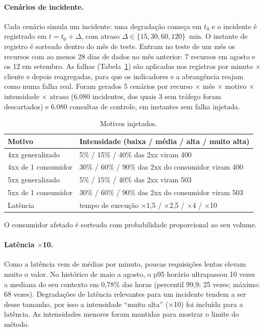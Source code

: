\documentclass[sigconf,nonacm]{acmart}
\begin{document}
\paragraph{Cenários de incidente.} Cada cenário simula um incidente: uma degradação começa em $t_0$ e o incidente é registrado em $t=t_0+\Delta$, com atraso $\Delta\in\{15,30,60,120\}$~min. O instante de registro é sorteado dentro do mês de teste. Entram no teste de um mês os recursos com ao menos 28 dias de dados no mês anterior: 7 recursos em agosto e os 12 em setembro. As falhas (Tabela~\ref{tab:falhas}) são aplicadas nos registros por minuto $\times$ cliente e depois reagregadas, para que os indicadores e a abrangência reajam como numa falha real. Foram gerados 5 cenários por recurso $\times$ mês $\times$ motivo $\times$ intensidade $\times$ atraso (6.080 incidentes, dos quais 3 sem tráfego foram descartados) e 6.080 consultas de controle, em instantes sem falha injetada.

\begin{table}[t]
  \caption{Motivos injetados.}
  \label{tab:falhas}
  \small
  \begin{tabular}{p{}p{}}
    \toprule
    Motivo & Intensidade (baixa / média / alta / muito alta) \\
    \midrule
    4xx generalizado & 5\% / 15\% / 40\% das 2xx viram 400 \\
    4xx de 1 consumidor & 30\% / 60\% / 90\% das 2xx do consumidor viram 400 \\
    5xx generalizado & 5\% / 15\% / 40\% das 2xx viram 503 \\
    5xx de 1 consumidor & 30\% / 60\% / 90\% das 2xx do consumidor viram 503 \\
    Latência & tempo de execução $\times$1,5 / $\times$2,5 / $\times$4 / $\times$10 \\
    \bottomrule
  \end{tabular}
  \par\smallskip\footnotesize O consumidor afetado é sorteado com probabilidade proporcional ao seu volume.
\end{table}

\paragraph{Latência $\times$10.} Como a latência vem de médias por minuto, poucas requisições lentas elevam muito o valor. No histórico de maio a agosto, o p95 horário ultrapassou 10 vezes a mediana do seu contexto em 0,78\% das horas (percentil 99,9: 25 vezes; máximo: 68 vezes). Degradações de latência relevantes para um incidente tendem a ser desse tamanho, por isso a intensidade ``muito alta'' ($\times$10) foi incluída para a latência. As intensidades menores foram mantidas para mostrar o limite do método.
\end{document}
